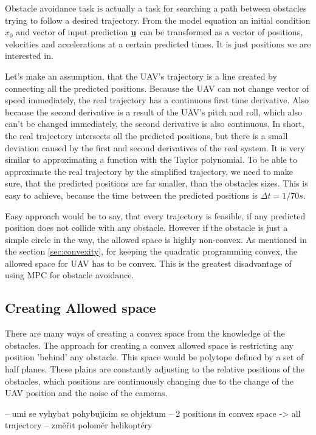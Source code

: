 \documentclass{article}
\begin{document}
Obstacle avoidance task is actually a task for searching a path between obstacles trying to follow a desired trajectory. From the model equation an initial condition $x_0$ and vector of input prediction $\textbf{\underline{u}}$ can be transformed as a vector of positions, velocities and accelerations at a certain predicted times. It is just positions we are interested in. 

Let's make an assumption, that the UAV's trajectory is a line created by connecting all the predicted positions. Because the UAV can not change vector of speed immediately, the real trajectory has a continuous first time derivative. Also because the second derivative is a result of the UAV's pitch and roll, which also can't be changed immediately, the second derivative is also continuous. In short, the real trajectory intersects all the predicted positions, but there is a small deviation caused by the first and second derivatives of the real system. It is very similar to approximating a function with the Taylor polynomial. To be able to approximate the real trajectory by the simplified trajectory, we need to make sure, that the predicted positions are far smaller, than the obstacles sizes. This is easy to achieve, because the time between the predicted positions is $\Delta t = 1/70s$.

Easy approach would be to say, that every trajectory is feasible, if any predicted position does not collide with any obstacle. However if the obstacle is just a simple circle in the way, the allowed space is highly non-convex. As mentioned in the section \ref{sec:convexity}, for keeping the quadratic programming convex, the allowed space for UAV has to be convex. This is the greatest disadvantage of using MPC for obstacle avoidance. 

\subsection{Creating Allowed space}

There are many ways of creating a convex space from the knowledge of the obstacles.
The approach for creating a convex allowed space is restricting any position 'behind' any obstacle. This space would be polytope defined by a set of half planes. These plains are constantly adjusting to the relative positions of the obstacles, which positions are continuously changing due to the change of the UAV position and the noise of the cameras.















-- umi se vyhybat pohybujicim se objektum
-- 2 positions in convex space -> all trajectory
-- změřit poloměr helikoptéry
\end{document}
